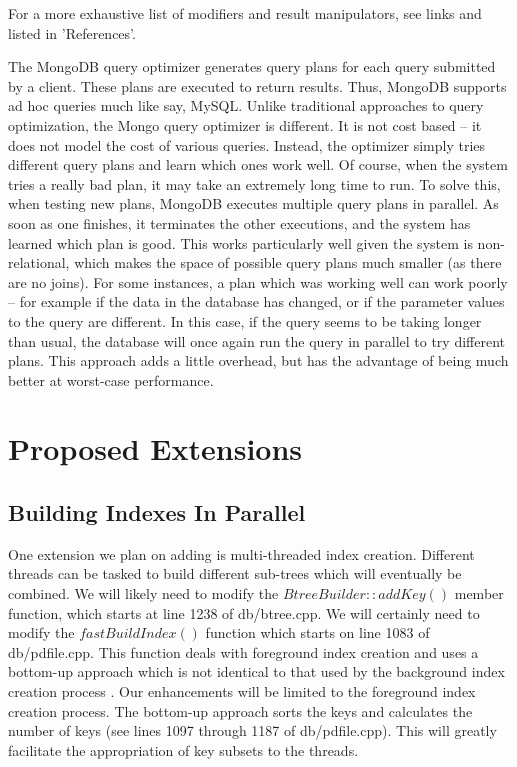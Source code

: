 \documentclass{dependencies/acm_proc_article-sp}
\begin{document}
For a more exhaustive list of modifiers and result manipulators, see links\cite{11} and \cite{12} listed in 'References'.

The MongoDB query optimizer generates query plans for each query submitted by a client.
These plans are executed to return results.
Thus, MongoDB supports ad hoc queries much like say, MySQL.
Unlike traditional approaches to query optimization, the Mongo query optimizer is different.
It is not cost based -- it does not model the cost of various queries.
Instead, the optimizer simply tries different query plans and learn which ones work well.
Of course, when the system tries a really bad plan, it may take an extremely long time to run.
To solve this, when testing new plans, MongoDB executes multiple query plans in parallel.
As soon as one finishes, it terminates the other executions, and the system has learned which plan is good.
This works particularly well given the system is non-relational, which makes the space of possible query plans much smaller (as there are no joins).
For some instances, a plan which was working well can work poorly -- for example if the data in the database has changed, or if the parameter values to the query are different.
In this case, if the query seems to be taking longer than usual, the database will once again run the query in parallel to try different plans.
This approach adds a little overhead, but has the advantage of being much better at worst-case performance. \cite{13}
\section{Proposed Extensions}
\subsection{Building Indexes In Parallel}
One extension we plan on adding is multi-threaded index creation.
Different threads can be tasked to build different sub-trees which will eventually be combined. 
We will likely need to modify the $BtreeBuilder::addKey()$ member function, which starts at line 1238 of db/btree.cpp.  We will certainly need to modify the $fastBuildIndex()$ function which starts on line 1083 of db/pdfile.cpp.  This function deals with foreground index creation and uses a bottom-up approach which is not identical to that used by the background index creation process \cite{17}.  Our enhancements will be limited to the foreground index creation process.  The bottom-up approach sorts the keys and calculates the number of keys (see lines 1097 through 1187 of db/pdfile.cpp).  This will greatly facilitate the appropriation of key subsets to the threads. 
\end{document}
